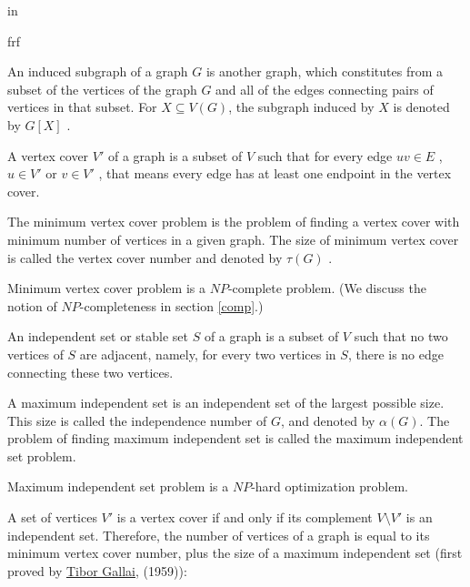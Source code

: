 \documentclass{beamer}
\begin{document}
in{frf	\begin{defi}
An induced subgraph of a graph $G$ is another graph, which constitutes from a subset of the vertices of the graph $G$ and all of the edges connecting pairs of vertices in that subset. For $X \subseteq V(G)$, the subgraph induced by $X$ is denoted by $G[X]$ .
\end{defi}


\begin{defi}
A vertex cover $V'$ of a graph is a subset of $V$ such that for every edge $uv \in E$ , $u \in V'$ or $v \in V'$ , that means every edge has at least one endpoint in the vertex cover. 

The minimum vertex cover problem is the problem of finding a vertex  cover with minimum number of vertices in a given graph. The size of minimum vertex cover is called the vertex cover number and denoted by $\tau(G)$ .
\end{defi}

\begin{theorem}
Minimum vertex cover problem is a $NP$-complete problem.\cite{cormen} (We discuss the notion of $NP$-completeness in section \ref{comp}.) 
\end{theorem}

\begin{defi}
An independent set or stable set $S$ of a graph is a subset
of $V$ such that no two vertices of $S$ are adjacent, namely, for every two
vertices in $S$, there is no edge connecting these two vertices. 

A maximum independent set is an independent set of the largest possible size. This size is called the independence number of $G$, and denoted by $\alpha(G)$. The problem of finding maximum independent set is called the maximum independent set problem.
\end{defi}

\begin{theorem}	
Maximum independent set problem is a $NP$-hard optimization problem.\cite{karp}
\end{theorem}

\begin{rema}
A set of vertices $V'$ is a vertex cover if and only if its complement
$V \setminus V'$ is an independent set. Therefore, the number of vertices of a graph
is equal to its minimum vertex cover number, plus the size of a maximum
independent set (first proved by \href{https://en.wikipedia.org/wiki/Tibor_Gallai}{Tibor Gallai}, (1959)\cite{gallai}):


\end{rema}}
\end{document}
